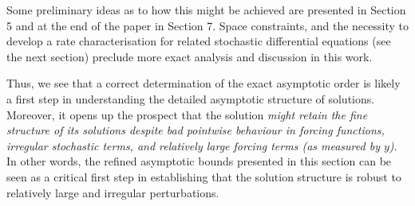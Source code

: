 \documentclass[a4paper,10pt,reqno]{amsart}
\numberwithin{equation}{section}
\theoremstyle{definition}
\theoremstyle{remark}
\DeclareMathOperator{\1}{\mathbbm 1}
\begin{document}
Some preliminary ideas as to how this might be achieved are presented in Section 5 and at the end of the paper in Section 7. Space constraints, and the necessity to develop a rate characterisation for related stochastic differential equations (see the next section) preclude more exact analysis and discussion in this work. 

Thus, we see that a correct determination of the exact asymptotic order is likely a first step in understanding the detailed asymptotic structure of solutions. Moreover, it opens up the prospect that the solution \textit{might retain the fine structure of its solutions despite bad pointwise behaviour in forcing functions, irregular stochastic terms, and relatively large forcing terms (as measured by $y$)}. In other words, the refined asymptotic bounds presented in this section can be seen as a critical first step in establishing that the solution structure is robust to relatively large and irregular perturbations.     

\vspace{-0.25in}
\end{document}

